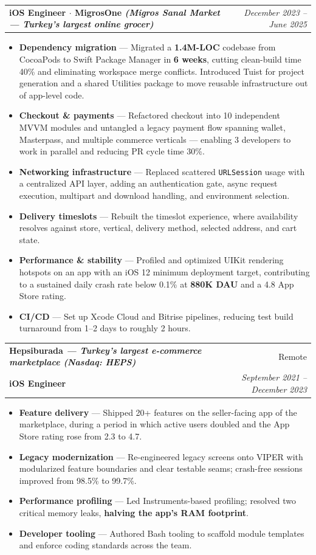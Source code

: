 \documentclass[a4paper,11pt]{article}
\makeatletter
\newcommand{\resumeItem}[2]{
  \item\small{
    \textbf{#1} --- #2\vspace{-2pt}
  }
}
\newcommand{\resumeSubheading}[4]{
  \vspace{2pt}\item
    \begin{tabular*}{0.97\textwidth}[t]{l@{\extracolsep{\fill}}r}
      \textbf{#1} & \small#2 \\
      \small\textbf{#3} & \textit{\small #4} \\
    \end{tabular*}\vspace{-5pt}
}
\newcommand{\resumeSubPosition}[2]{
    \vspace{6pt}
    \begin{tabular*}{0.97\textwidth}{l@{\extracolsep{\fill}}r}
      \small\textbf{#1} & \textit{\small #2} \\
    \end{tabular*}\vspace{-5pt}
}
\newcommand{\resumeItemListStart}{\begin{itemize}}
\newcommand{\resumeItemListEnd}{\end{itemize}\vspace{-5pt}}
\makeatother
\begin{document}
    \resumeSubPosition
      {iOS Engineer $\cdot$ MigrosOne \textnormal{\textit{(Migros Sanal Market --- Turkey's largest online grocer)}}}{December 2023 -- June 2025}
      \resumeItemListStart
        \resumeItem{Dependency migration}
          {Migrated a \textbf{1.4M-LOC} codebase from CocoaPods to Swift Package Manager in \textbf{6 weeks}, cutting clean-build time 40\% and eliminating workspace merge conflicts. Introduced Tuist for project generation and a shared Utilities package to move reusable infrastructure out of app-level code.}
        \resumeItem{Checkout \& payments}
          {Refactored checkout into 10 independent MVVM modules and untangled a legacy payment flow spanning wallet, Masterpass, and multiple commerce verticals --- enabling 3 developers to work in parallel and reducing PR cycle time 30\%.}
        \resumeItem{Networking infrastructure}
          {Replaced scattered \texttt{URLSession} usage with a centralized API layer, adding an authentication gate, async request execution, multipart and download handling, and environment selection.}
        \resumeItem{Delivery timeslots}
          {Rebuilt the timeslot experience, where availability resolves against store, vertical, delivery method, selected address, and cart state.}
        \resumeItem{Performance \& stability}
          {Profiled and optimized UIKit rendering hotspots on an app with an iOS 12 minimum deployment target, contributing to a sustained daily crash rate below 0.1\% at \textbf{880K DAU} and a 4.8 App Store rating.}
        \resumeItem{CI/CD}
          {Set up Xcode Cloud and Bitrise pipelines, reducing test build turnaround from 1--2 days to roughly 2 hours.}
      \resumeItemListEnd
 
    \pagebreak
    \resumeSubheading
      {Hepsiburada \textnormal{\small\textit{--- Turkey's largest e-commerce marketplace (Nasdaq: HEPS)}}}{Remote}
      {iOS Engineer}{September 2021 -- December 2023}
      \resumeItemListStart
        \resumeItem{Feature delivery}
          {Shipped 20+ features on the seller-facing app of the marketplace, during a period in which active users doubled and the App Store rating rose from 2.3 to 4.7.}
        \resumeItem{Legacy modernization}
          {Re-engineered legacy screens onto VIPER with modularized feature boundaries and clear testable seams; crash-free sessions improved from 98.5\% to 99.7\%.}
        \resumeItem{Performance profiling}
          {Led Instruments-based profiling; resolved two critical memory leaks, \textbf{halving the app's RAM footprint}.}
        \resumeItem{Developer tooling}
          {Authored Bash tooling to scaffold module templates and enforce coding standards across the team.}
      \resumeItemListEnd
 
\end{document}
